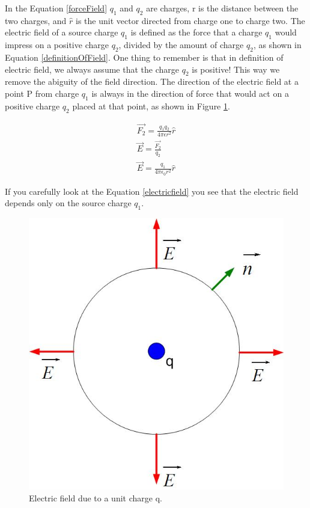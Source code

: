\documentclass{ximera}
\begin{document}
 In the Equation \ref{forceField} $q_1$ and $q_2$ are charges, r is the distance between the two charges, and $\hat{r}$ is the unit vector directed  from charge one to charge two. The electric field of a source charge $q_1$ is defined as the force that a charge $q_1$ would impress on a positive charge $q_2$, divided by the amount of charge $q_2$, as shown in Equation \ref{definitionOfField}. One thing to remember is that in definition of electric field, we always assume that the charge $q_2$ is positive! This way we remove the abiguity of the field direction. The direction of the electric field at a point P from charge $q_1$ is always in the direction of force that would act on a positive charge $q_2$ placed at that point, as shown in Figure \ref{UnitCh}.


\begin{eqnarray}
\vec{F_2}=\frac{q_1 q_2}{4 \pi \epsilon r^2 } \hat{r} \label{forceField}\\
\vec{E} = \frac{\vec{F_2}}{q_2} \label{definitionOfField} \\
\vec{E} =  \frac{q_1}{4 \pi \epsilon_0 r^2} \hat{r} \label{electricfield}
\end{eqnarray} 

If you carefully look at the Equation \ref{electricfield} you see that the electric field depends only on the source charge $q_1$. 

\begin{figure}[htbp]
\begin{center}
\includegraphics[scale=0.5]{../jpg/unitchargefield.jpg}
\end{center}
\caption{Electric field due to a unit charge q.}
\label{UnitCh}
\end{figure}
\end{document}
